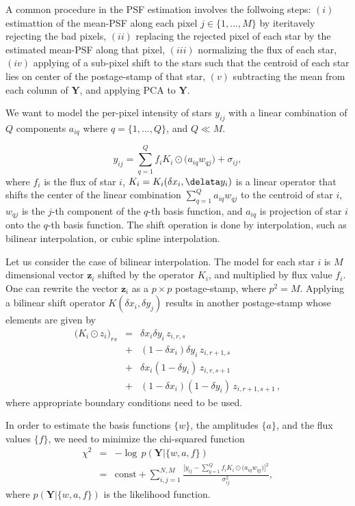 \documentclass[12pt, preprint]{aastex}
\newcommand{\beq}{\begin{equation}}
\newcommand{\eeq}{\end{equation}}
\begin{document}
A common procedure in the PSF estimation involves the follwoing steps: $(i)$ estimattion of the mean-PSF along each pixel $j\in\{1,...,M\}$
by iteritavely rejecting the bad pixels, $(ii)$ replacing the rejected pixel of each star by the estimated mean-PSF along that pixel, $(iii)$ 
normalizing the flux of each star, $(iv)$ applying of a sub-pixel shift to the stars such that the centroid of each star lies on center 
of the postage-stamp of that star, $(v)$ subtracting the mean from each column of $\mathbf{Y}$, and applying PCA to $\mathbf{Y}$.

We want to model the per-pixel intensity of stars $y_{ij}$ with a linear combination of $Q$ components $a_{iq}$ where $q=\{1,...,Q\}$, and $Q\ll M$.

\beq
y_{ij} = \sum_{q=1}^{Q} f_{i}K_{i}\odot\big(a_{iq}w_{qj}\big) + \sigma_{ij},
\eeq
where $f_{i}$ is the flux of star $i$, $K_{i} = K_{i}(\delta x_{i} , \delata y_{i})$ is a linear operator that shifts the 
center of the linear combination $\sum_{q=1}^{Q}a_{iq}w_{qj}$ to the centroid of star $i$, $w_{qj}$ is the 
$j$-th component of the $q$-th basis function, and $a_{iq}$ is projection of star $i$ onto the $q$-th basis function. The shift
operation is done by interpolation, such as bilinear interpolation, or cubic spline interpolation. 

Let us consider the case of 
bilinear interpolation. The model for each star $i$ is $M$ dimensional vector $\mathbf{z}_{i}$ shifted by the operator $K_{i}$,
and multiplied by flux value $f_{i}$. One can rewrite the vector $\mathbf{z}_{i}$ as a $p\times p$ postage-stamp, where $p^{2}=M$.
Applying a bilinear shift operator $K(\delta x_{i} , \delta y_{j})$ results in another postage-stamp whose elements are given by
\begin{eqnarray}
\big(K_{i}\odot z_{i}\big)_{rs} &=& \delta x_{i} \delta y_{i} \, z_{i,r,s} \nonumber \\
                                &+& (1 - \delta x_{i}) \delta y_{i} \, z_{i,r+1,s} \nonumber \\ 
                                &+& \delta x_{i} (1-\delta y_{i}) \, z_{i,r,s+1} \nonumber \\ 
                                &+& (1 - \delta x_{i})(1-\delta y_{i}) \, z_{i,r+1,s+1} \, ,
\end{eqnarray}
where appropriate boundary conditions need to be used. 

In order to estimate the basis functions $\{w\}$, the amplitudes $\{a\}$,
and the flux values $\{f\}$, we need to
minimize the chi-squared function
\begin{eqnarray}
\chi^{2} &=& - \log \, p(\mathbf{Y}|\{w,a,f\}) \\
         &=& \text{const} + \sum_{i,j=1}^{N,M} \frac{\Big[y_{ij} - 
             \sum_{q=1}^{Q} f_{i}K_{i}\odot\big(a_{iq}w_{qj}\big)\Big]^{2}}{\sigma_{ij}^{2}},
\end{eqnarray}
where $p(\mathbf{Y}|\{w,a,f\})$ is the likelihood function.
\end{document}
